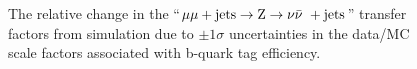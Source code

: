 \begin{figure}[!h]
{  } \\
   ~
  \caption{\label{fig:tfSyst_bsf_mmZinv} The relative change in the
    ``$\mu\mu + \textrm{jets} \rightarrow {\text Z} \rightarrow \nu\bar{\nu}\ + \textrm{jets}$'' transfer factors from
    simulation due to $\pm1\sigma$ uncertainties in the data/MC scale
    factors associated with b-quark tag efficiency.  }
\end{figure}

